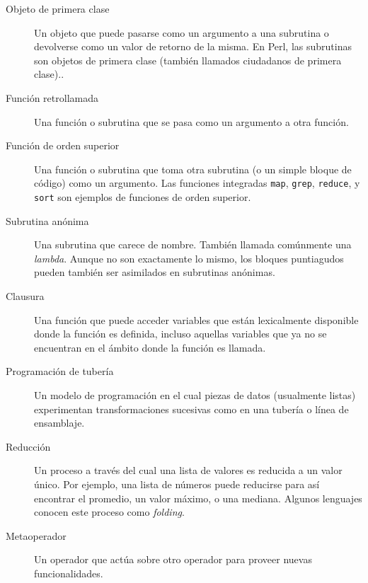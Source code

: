 \begin{description}

\item[Objeto de primera clase] Un objeto que puede
pasarse como un argumento a una subrutina o devolverse 
como un valor de retorno de la misma. En Perl, las subrutinas
son objetos de primera clase (también llamados ciudadanos de
primera clase).. 

\item[Función retrollamada] Una función o subrutina que se pasa
como un argumento a otra función.

\item[Función de orden superior] Una función o subrutina que toma
otra subrutina (o un simple bloque de código) como un 
argumento. Las funciones integradas 
{\tt map}, {\tt grep}, {\tt reduce}, y {\tt sort}
son ejemplos de funciones de orden superior.

\item[Subrutina anónima] Una subrutina que carece de nombre. 
También llamada comúnmente una \emph{lambda}. Aunque no
son exactamente lo mismo, los bloques puntiagudos pueden también
ser asimilados en subrutinas anónimas.

\item[Clausura] Una función que puede acceder variables que 
están lexicalmente disponible donde la función es definida, 
incluso aquellas variables que ya no se encuentran en el
ámbito donde la función es llamada.

\item[Programación de tubería] Un modelo de programación en el
cual piezas de datos (usualmente listas) experimentan transformaciones
sucesivas como en una tubería o línea de ensamblaje.

\item[Reducción] Un proceso a través del cual una lista de valores
es reducida a un valor único. Por ejemplo, una lista de números
puede reducirse para así encontrar el promedio, un valor
máximo, o una mediana. Algunos lenguajes conocen este proceso como
\emph{folding}.

\item[Metaoperador] Un operador que actúa sobre otro operador para
proveer nuevas funcionalidades.


\end{description}
